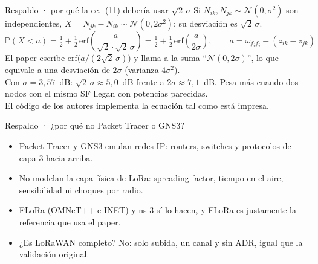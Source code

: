\documentclass[aspectratio=169,11pt]{beamer}
\begin{document}
\begin{frame}{Respaldo · por qué la ec.~(11) debería usar $\sqrt{2}\,\sigma$}
  \vspace{2mm}
  Si $N_{ik},N_{jk}\sim\mathcal{N}(0,\sigma^2)$ son independientes, $X=N_{jk}-N_{ik}\sim\mathcal{N}(0,2\sigma^2)$: su desviación es $\sqrt{2}\,\sigma$.
  \[
    \mathbb{P}(X<a)=\tfrac12+\tfrac12\,\mathrm{erf}\!\left(\frac{a}{\sqrt{2}\cdot\sqrt{2}\,\sigma}\right)
      =\tfrac12+\tfrac12\,\mathrm{erf}\!\left(\frac{a}{2\sigma}\right),
      \qquad a=\omega_{f_if_j}-(z_{ik}-z_{jk})
  \]
  El paper escribe $\mathrm{erf}\bigl(a/(2\sqrt{2}\,\sigma)\bigr)$ y llama a la suma “$\mathcal{N}(0,2\sigma)$”,
  lo que equivale a una desviación de $2\sigma$ (varianza $4\sigma^2$).\\[3mm]
  Con $\sigma=3{,}57$~dB: $\sqrt2\,\sigma\approx5{,}0$~dB frente a $2\sigma\approx7{,}1$~dB. Pesa más cuando dos nodos con el mismo SF
  llegan con potencias parecidas.\\[3mm]
  {\small\textcolor{muted}{El código de los autores implementa la ecuación tal como está impresa.}}
\end{frame}

\begin{frame}{Respaldo · ¿por qué no Packet Tracer o GNS3?}
  \vspace{3mm}
  \begin{itemize}\setlength\itemsep{3mm}
    \item Packet Tracer y GNS3 emulan redes IP: routers, switches y protocolos de capa 3 hacia arriba.
    \item No modelan la capa física de LoRa: spreading factor, tiempo en el aire, sensibilidad ni choques por radio.
    \item FLoRa (OMNeT++ e INET) y ns-3 sí lo hacen, y FLoRa es justamente la referencia que usa el paper.
    \item ¿Es LoRaWAN completo? No: solo subida, un canal y sin ADR, igual que la validación original.
  \end{itemize}
\end{frame}
\end{document}

